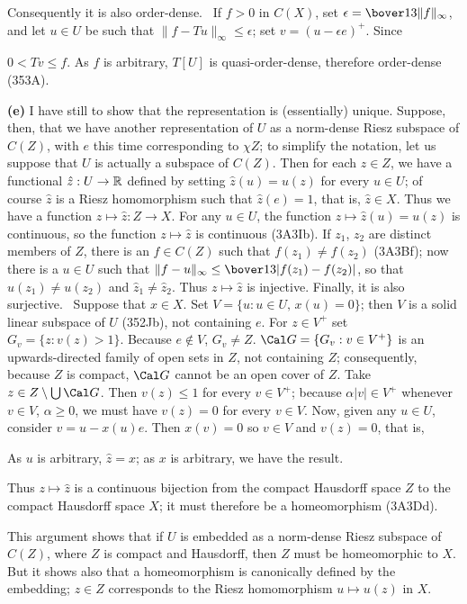 {Consequently it is also order-dense.   \Prf\ If $f>0$ in $C(X)$, set
$\epsilon=\bover13\|f\|_{\infty}$, and let $u\in U$ be such that
$\|f-Tu\|_{\infty}\le\epsilon$;  set $v=(u-\epsilon e)^+$.   Since
     
     
\noindent $0<Tv\le f$.   As $f$ is arbitrary, $T[U]$ is
quasi-order-dense, therefore order-dense (353A).\ \Qed
     
\medskip
     
{\bf (e)} I have still to show that the representation is (essentially)
unique.   Suppose, then, that we have another representation of $U$ as a
norm-dense Riesz subspace of $C(Z)$, with $e$ this time corresponding to
$\chi Z$;  to simplify the notation, let us suppose that $U$ is actually
a subspace of $C(Z)$.   Then for each $z\in Z$, we have a functional
$\hat z:U\to\Bbb R$ defined by setting $\hat z(u)=u(z)$ for every $u\in
U$;  of course $\hat z$ is a Riesz homomorphism such that $\hat z(e)=1$,
that is, $\hat z\in X$.   Thus we have a function $z\mapsto\hat z:Z\to
X$.   For any $u\in U$, the function
$z\mapsto\hat z(u)=u(z)$ is continuous, so the function $z\mapsto\hat z$
is continuous (3A3Ib).   If $z_1$, $z_2$ are distinct members of $Z$,
there is an $f\in C(Z)$ such that $f(z_1)\ne f(z_2)$ (3A3Bf);  now
there is a $u\in U$ such that
$\|f-u\|_{\infty}\le\bover13|f(z_1)-f(z_2)|$, so that $u(z_1)\ne u(z_2)$
and $\hat z_1\ne\hat z_2$.   Thus $z\mapsto\hat z$ is injective.
Finally, it is also surjective.   \Prf\ Suppose that $x\in X$.   Set
$V=\{u:u\in U,\,x(u)=0\}$;  then $V$ is a solid linear subspace of $U$
(352Jb), not containing $e$.   For $z\in V^+$ set $G_v=\{z:v(z)>1\}$.
Because $e\notin V$, $G_v\ne Z$.    $\Cal G=\{G_v:v\in V^+\}$ is an
upwards-directed family of open sets in $Z$, not containing $Z$;
consequently, because $Z$ is compact, $\Cal G$ cannot be an open cover
of $Z$.   Take $z\in Z\setminus\bigcup\Cal G$.   Then $v(z)\le 1$ for
every $v\in V^+$;  because $\alpha|v|\in V^+$ whenever $v\in V$,
$\alpha\ge 0$, we must have $v(z)=0$ for every $v\in V$.   Now, given
any $u\in U$, consider $v=u-x(u)e$.   Then $x(v)=0$ so $v\in V$ and
$v(z)=0$, that is,
     
     
\noindent  As $u$ is arbitrary, $\hat z=x$;  as $x$ is arbitrary, we
have the result.\ \Qed
     
Thus $z\mapsto\hat z$ is a continuous bijection from the compact
Hausdorff space $Z$ to the compact Hausdorff space $X$;  it must
therefore be a homeomorphism (3A3Dd).
     
This argument shows that if $U$ is embedded as a norm-dense Riesz
subspace of $C(Z)$, where $Z$ is compact and Hausdorff, then $Z$ must be
homeomorphic to $X$.   But it shows also that a homeomorphism is
canonically defined by the embedding;  $z\in Z$ corresponds to the Riesz
homomorphism $u\mapsto u(z)$ in $X$.
}%
     
